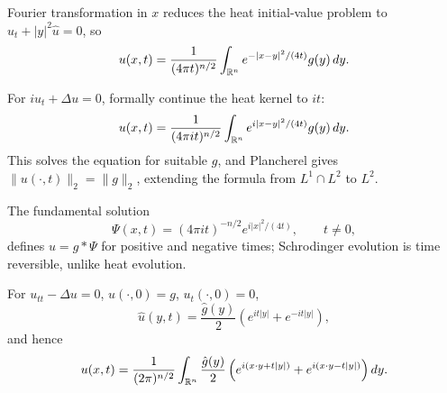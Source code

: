 \begin{example}
\label{ex:fourier-transform-heat-fundamental-solution}

Fourier transformation in $x$ reduces the heat initial-value problem to
$\hat u_t+|y|^2\hat u=0$, so
\[
u(x,t)=\frac1{(4\pi t)^{n/2}}\int_{\mathbb{R}^n}e^{-|x-y|^2/(4t)}g(y)\,dy.
\]
\end{example}

\begin{example}
\label{ex:schrodinger-fundamental-solution}

For $iu_t+\Delta u=0$, formally continue the heat kernel to $it$:
\[
u(x,t)=\frac1{(4\pi it)^{n/2}}\int_{\mathbb{R}^n}e^{i|x-y|^2/(4t)}g(y)\,dy.
\]
This solves the equation for suitable $g$, and Plancherel gives
$\|u(\cdot,t)\|_2=\|g\|_2$, extending the formula from $L^1\cap L^2$ to
$L^2$.
\end{example}

\begin{remark}
\label{rem:schrodinger-time-reversibility}

The fundamental solution
\[
\Psi(x,t)=(4\pi it)^{-n/2}e^{i|x|^2/(4t)},\qquad t\ne0,
\]
defines $u=g*\Psi$ for positive and negative times; Schrodinger evolution is
time reversible, unlike heat evolution.
\end{remark}

\begin{example}
\label{ex:fourier-transform-wave-equation}

For $u_{tt}-\Delta u=0$, $u(\cdot,0)=g$, $u_t(\cdot,0)=0$,
\[
\hat u(y,t)=\frac{\hat g(y)}2(e^{it|y|}+e^{-it|y|}),
\]
and hence
\[
u(x,t)=\frac1{(2\pi)^{n/2}}\int_{\mathbb{R}^n}\frac{\hat g(y)}2
\left(e^{i(x\cdot y+t|y|)}+e^{i(x\cdot y-t|y|)}\right)dy.
\]
\end{example}

